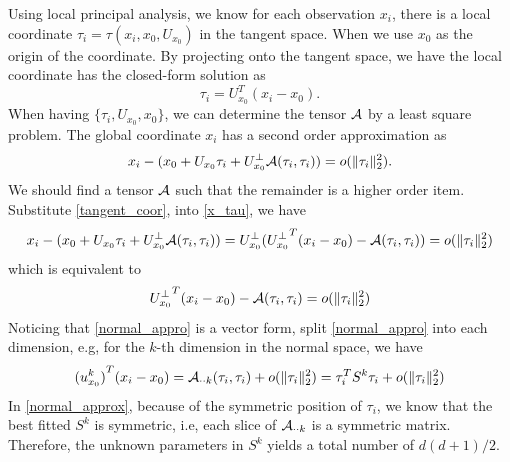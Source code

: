 \documentclass[aos,preprint]{imsart}
\theoremstyle{remark}
\begin{document}
Using local principal analysis, we know for each observation $x_i$, there is a local coordinate $\tau_i = \tau(x_i,x_0, U_{x_0})$ in the tangent space. When we use $x_0$ as the origin of the coordinate. By projecting onto the tangent space, we have the local coordinate has the closed-form solution as
\begin{equation}\label{tangent_coor}
\tau_i = U_{x_0}^T (x_i -x_0).
\end{equation}
When having $\{\tau_i, U_{x_0}, x_0\}$, we can determine the tensor $\cal A$ by a least square problem. The global coordinate $x_i$ has a second order approximation as
\begin{equation}\label{x_tau}
 x_i  -  (x_0+ U_{x_0} \tau_i + U_{x_0}^{\perp} {\cal A}(\tau_i,\tau_i)) = o(\|\tau_i\|_2^2).
\end{equation}
We should find a tensor $\cal A$ such that the remainder is a higher order item.
Substitute \eqref{tangent_coor}, into \eqref{x_tau}, we have
\[
 x_i  -  (x_0+ U_{x_0} \tau_i + U_{x_0}^{\perp} {\cal A}(\tau_i,\tau_i))
 =U_{x_0}^\perp( {U_{x_0}^\perp}^T (x_i -x_0) -{\cal A}(\tau_i,\tau_i) )= o(\|\tau_i\|_2^2)
\]
which is equivalent to 
\begin{equation}\label{normal_appro}
 {U_{x_0}^\perp}^T (x_i -x_0) -{\cal A}(\tau_i,\tau_i) = o(\|\tau_i\|_2^2)
\end{equation}
Noticing that \eqref{normal_appro} is a vector form, split \eqref{normal_appro} into each dimension, e.g, for the $k$-th dimension in the normal space, we have
\begin{equation}\label{normal_approx}
 {(u^k_{x_0})}^T (x_i -x_0) 
={\cal A}_{\cdot\cdot k}(\tau_i,\tau_i) +  o(\|\tau_i\|_2^2)=\tau_i^T S^{k}\tau_i + o(\|\tau_i\|_2^2)\end{equation}
In \eqref{normal_approx}, because of the symmetric position of $\tau_i$, we know that the best fitted $S^k$ is symmetric, i.e, each slice of ${\cal A}_{\cdot\cdot k}$ is a symmetric matrix. Therefore, the unknown parameters in $S^k$ yields a total number of ${d(d+1)}/{2}$. 
\end{document}
